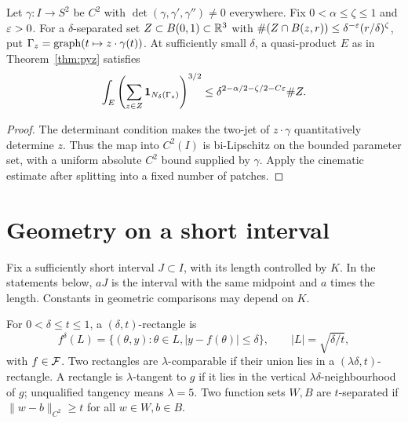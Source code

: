 \begin{proposition}
\label{prop:pyz-curve-family}
Let $\gamma:I\to S^2$ be $C^2$ with
$\det(\gamma,\gamma',\gamma'')\ne0$ everywhere. Fix
$0<\alpha\leq\zeta\leq1$ and $\varepsilon>0$.
For a $\delta$-separated set $Z\subset B(0,1)\subset\mathbb{R}^3$
with $\#(Z\cap B(z,r))\leq\delta^{-\varepsilon}(r/\delta)^\zeta$,
put $\Gamma_z=\operatorname{graph}(t\mapsto z\cdot\gamma(t))$.
At sufficiently small $\delta$, a quasi-product $E$ as in
Theorem~\ref{thm:pyz} satisfies
\[
 \int_E\left(\sum_{z\in Z}\mathbf{1}_{N_\delta(\Gamma_z)}\right)^{3/2}
              \leq\delta^{2-\alpha/2-\zeta/2-C\varepsilon}\#Z.
\]
\end{proposition}
\begin{proof}
The determinant condition makes the two-jet of
$z\cdot\gamma$ quantitatively determine $z$. Thus the map into
$C^2(I)$ is bi-Lipschitz on the bounded parameter set, with a
uniform absolute $C^2$ bound supplied by $\gamma$. Apply the
cinematic estimate after splitting into a fixed number of patches.
\end{proof}

\section{Geometry on a short interval}

Fix a sufficiently short interval $J\subset I$, with its length
controlled by $K$. In the statements below, $aJ$ is the interval
with the same midpoint and $a$ times the length. Constants in
geometric comparisons may depend on $K$.

\begin{definition}
\label{def:cinematic-rectangle}
\leanok
For $0<\delta\leq t\leq1$, a $(\delta,t)$-rectangle is
\[
         f^\delta(L)=\{(\theta,y):\theta\in L, |y-f(\theta)|\leq\delta\},
         \qquad |L|=\sqrt{\delta/t},
\]
with $f\in\mathcal{F}$. Two rectangles are $\lambda$-comparable if
their union lies in a $(\lambda\delta,t)$-rectangle. A rectangle
is $\lambda$-tangent to $g$ if it lies in the vertical
$\lambda\delta$-neighbourhood of $g$; unqualified tangency means
$\lambda=5$. Two function sets $W,B$ are $t$-separated if
$\|w-b\|_{C^2}\geq t$ for all $w\in W,b\in B$.
\end{definition}

